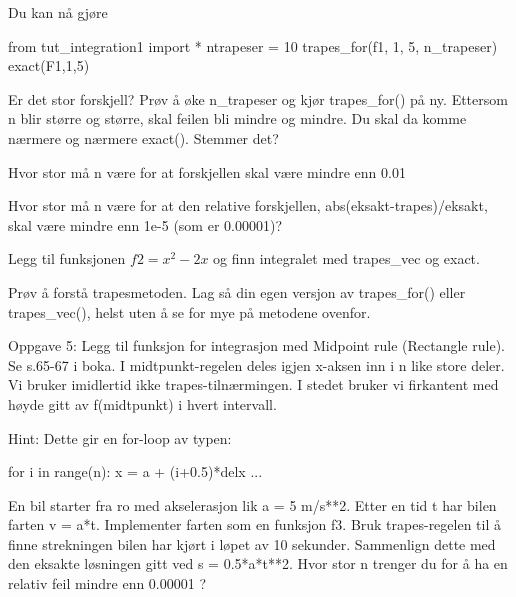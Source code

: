 Du kan nå gjøre
\begin{usncodebox}
from tut_integration1 import *
ntrapeser = 10
trapes_for(f1, 1, 5, n_trapeser)
exact(F1,1,5)
\end{usncodebox}

Er det stor forskjell? Prøv å øke n\_{}trapeser og kjør trapes\_{}for() på ny. Ettersom n blir større og større, skal feilen bli mindre og mindre. Du skal da komme nærmere og nærmere exact(). Stemmer det? 

\begin{question}
Hvor stor må n være for at forskjellen skal være mindre enn 0.01
\end{question}


\begin{question}
Hvor stor må n være for at den relative forskjellen, abs(eksakt-trapes)/eksakt, skal være mindre enn 1e-5 (som er 0.00001)?
\end{question} 

\begin{question}
Legg til funksjonen $f2 = x^2-2x$ og finn integralet med trapes\_{}vec og exact. 
\end{question}

\begin{question}
Prøv å forstå trapesmetoden. Lag så din egen versjon av trapes\_{}for() eller trapes\_{}vec(), helst uten å se for mye på metodene ovenfor.
\end{question}

\begin{question}
Oppgave 5: Legg til funksjon for integrasjon med Midpoint rule (Rectangle rule). 
Se s.65-67 i boka.
I midtpunkt-regelen deles igjen x-aksen inn i n like store deler. 
Vi bruker imidlertid ikke trapes-tilnærmingen.
I stedet bruker vi firkantent med høyde gitt av f(midtpunkt) i hvert intervall.
\end{question}

Hint: Dette gir en for-loop av typen:
\begin{usncodebox}
    for i in range(n):
        x = a + (i+0.5)*delx
        ... 
\end{usncodebox}

\begin{question}
En bil starter fra ro med akselerasjon lik a = 5 m/s**2. Etter en tid t har bilen farten v = a*t. Implementer farten som en funksjon f3. Bruk trapes-regelen til å finne strekningen bilen har kjørt i løpet av 10 sekunder. Sammenlign dette med den eksakte løsningen gitt ved s = 0.5*a*t**2. Hvor stor n trenger du for å ha en relativ feil mindre enn 0.00001 ?
\end{question}

